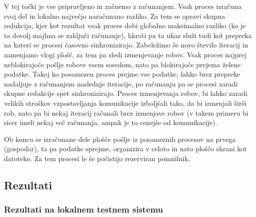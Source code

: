 \documentclass[a4paper,titlepage,11pt]{article}
\begin{document}
V tej točki je vse pripravljeno in začnemo z računanjem. Vsak proces izračuna svoj del in lokalno največjo naračunano razliko. Za tem se opravi skupna redukcija, kjer kot rezultat vsak proces dobi globalno maksimalno razliko (ko je ta dovolj majhna se zaključi računanje), hkrati pa ta ukaz služi tudi kot prepreka na kateri se procesi časovno sinhronizirajo. Zabeležimo še novo število iteracij in zamenjamo vlogi plošč, za tem pa sledi izmenjevanje robov. Vsak proces najprej neblokirajoče pošlje robove vsem sosedom, nato pa blokirajoče prejema želene podatke. Takoj ko posamezen proces prejme vse podatke, lahko brez prepreke nadaljuje z računanjem naslednje iteracije, po računanju pa se procesi zaradi skupne redukcije spet sinhronizirajo. Proces izmenjevanja robov, bi lahko zaradi velikih stroškov vzpostavljanja komunikacije izboljšali tako, da bi izmenjali širši rob, nato pa bi nekaj iteracij računali brez izmenjave robov (v takem primeru bi sicer imeli nekaj več računanja, ampak je to cenejše od komunikacije).

Ob koncu se izračunane dele plošče pošlje iz posameznih procesov na prvega (gospodar), ta pa podatke sprejme, organizira v celoto in nato ploščo shrani kot datoteko. Za tem procesi le še počistijo rezerviran pomnilnik.

\pagebreak
\subsection{Rezultati}
\subsubsection{Rezultati na lokalnem testnem sistemu}
\end{document}
